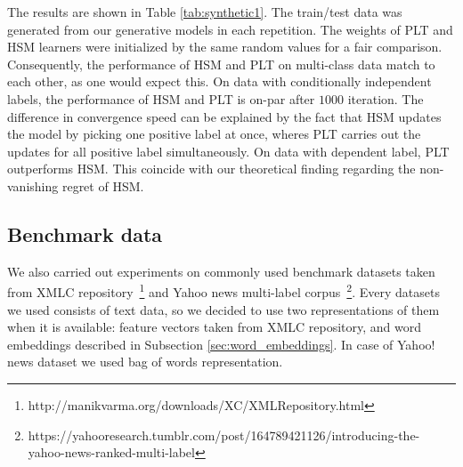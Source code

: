 \documentclass{article}
\newcommand{\Algo}[1]{\textsc{#1}}
\begin{document}
{The results are shown in Table \ref{tab:synthetic1}. The train/test data was generated from our generative models in each repetition. The weights of \Algo{PLT} and \Algo{HSM} learners were initialized by the same random values for a fair comparison. Consequently, the performance of \Algo{HSM} and \Algo{PLT} on multi-class data match to each other, as one would expect this. On data with conditionally independent labels, the performance of \Algo{HSM} and \Algo{PLT} is on-par after $1000$ iteration. The difference in convergence speed can be explained by the fact that \Algo{HSM} updates the model by picking one positive label at once, wheres \Algo{PLT}  carries out the updates for all positive label simultaneously. On data with dependent label, \Algo{PLT} outperforms \Algo{HSM}. This coincide with our theoretical finding regarding the non-vanishing regret of \Algo{HSM}. 





\subsection{Benchmark data}

We also carried out experiments on commonly used benchmark datasets taken from XMLC repository~\footnote{http://manikvarma.org/downloads/XC/XMLRepository.html} and Yahoo news multi-label corpus~\footnote{https://yahooresearch.tumblr.com/post/164789421126/introducing-the-yahoo-news-ranked-multi-label}. Every datasets we used consists of text data, so we decided to use two representations of them when it is available: feature vectors taken from XMLC repository, and word embeddings described in Subsection \ref{sec:word_embeddings}. In case of Yahoo! news dataset we used bag of words representation.


}
\end{document}
